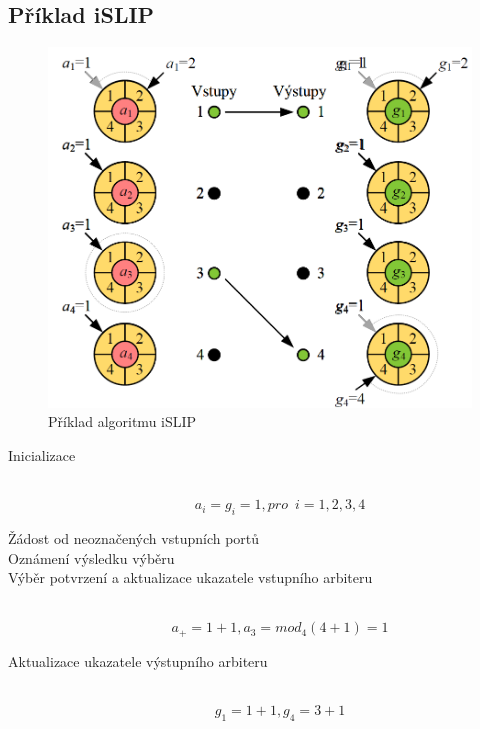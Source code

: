 \subsection{Příklad iSLIP}
\begin{figure}[ht]
\centering
  \begin{center}
    \includegraphics[scale=0.5]{images/iSLIP_priklad.png}
  \end{center}
  \caption[Příklad algoritmu iSLIP]{Příklad algoritmu iSLIP}
\end{figure}
\begin{description}
  \item[Inicializace] \hfill \\
  \begin{equation}
      a_i = g_i = 1, pro \,\,\, i = 1, 2, 3, 4
  \end{equation}
  \item [Žádost od neoznačených vstupních portů] \hfill 
  \item [Oznámení výsledku výběru] \hfill 
  \item [Výběr potvrzení a aktualizace ukazatele vstupního arbiteru] \hfill \\
  \begin{equation}
    a_+ = 1 + 1, a_3 = mod_4{(4+1)} = 1
  \end{equation}
  \item [Aktualizace ukazatele výstupního arbiteru] \hfill \\
  \begin{equation}
      g_1 = 1 + 1, g_4 = 3 + 1
  \end{equation}
\end{description}
